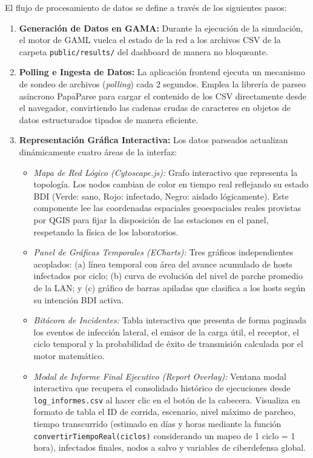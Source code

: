 El flujo de procesamiento de datos se define a través de los siguientes pasos:
\begin{enumerate}
    \item \textbf{Generación de Datos en GAMA:} Durante la ejecución de la simulación, el motor de GAML vuelca el estado de la red a los archivos CSV de la carpeta \texttt{public/results/} del dashboard de manera no bloqueante.
    \item \textbf{Polling e Ingesta de Datos:} La aplicación frontend ejecuta un mecanismo de sondeo de archivos (\textit{polling}) cada 2 segundos. Emplea la librería de parseo asíncrono PapaParse para cargar el contenido de los CSV directamente desde el navegador, convirtiendo las cadenas crudas de caracteres en objetos de datos estructurados tipados de manera eficiente.
    \item \textbf{Representación Gráfica Interactiva:} Los datos parseados actualizan dinámicamente cuatro áreas de la interfaz:
    \begin{itemize}
        \item \textit{Mapa de Red Lógico (Cytoscape.js):} Grafo interactivo que representa la topología. Los nodos cambian de color en tiempo real reflejando su estado BDI (Verde: sano, Rojo: infectado, Negro: aislado lógicamente). Este componente lee las coordenadas espaciales geoespaciales reales provistas por QGIS para fijar la disposición de las estaciones en el panel, respetando la física de los laboratorios.
        \item \textit{Panel de Gráficas Temporales (ECharts):} Tres gráficos independientes acoplados: (a) línea temporal con área del avance acumulado de hosts infectados por ciclo; (b) curva de evolución del nivel de parche promedio de la LAN; y (c) gráfico de barras apiladas que clasifica a los hosts según su intención BDI activa.
        \item \textit{Bitácora de Incidentes:} Tabla interactiva que presenta de forma paginada los eventos de infección lateral, el emisor de la carga útil, el receptor, el ciclo temporal y la probabilidad de éxito de transmisión calculada por el motor matemático.
        \item \textit{Modal de Informe Final Ejecutivo (Report Overlay):} Ventana modal interactiva que recupera el consolidado histórico de ejecuciones desde \texttt{log\_informes.csv} al hacer clic en el botón de la cabecera. Visualiza en formato de tabla el ID de corrida, escenario, nivel máximo de parcheo, tiempo transcurrido (estimado en días y horas mediante la función \texttt{convertirTiempoReal(ciclos)} considerando un mapeo de 1 ciclo = 1 hora), infectados finales, nodos a salvo y variables de ciberdefensa global.
    \end{itemize}
\end{enumerate}
